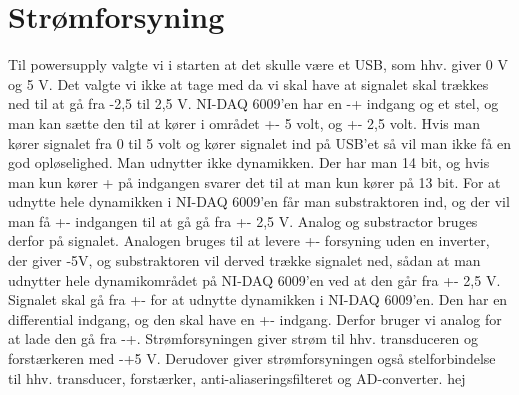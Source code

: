 \section{Strømforsyning}
Til powersupply valgte vi i starten at det skulle være et USB, som hhv. giver 0 V og 5 V. Det valgte vi ikke at tage med da vi skal have at signalet skal trækkes ned til at gå fra -2,5 til 2,5 V. NI-DAQ 6009'en har en -+ indgang og et stel, og man kan sætte den til at kører i området +- 5 volt, og +- 2,5 volt. Hvis man kører signalet fra 0 til 5 volt og kører signalet ind på USB’et så vil man ikke få en god opløselighed. Man udnytter ikke dynamikken. Der har man 14 bit, og hvis man kun kører + på indgangen svarer det til at man kun kører på 13 bit. For at udnytte hele dynamikken i NI-DAQ 6009’en får man substraktoren ind, og der vil man få +- indgangen til at gå gå fra +- 2,5 V. Analog og substractor bruges derfor på signalet. Analogen bruges til at levere +- forsyning uden en inverter, der giver -5V, og substraktoren vil derved trække signalet ned, sådan at  man udnytter hele dynamikområdet på NI-DAQ 6009’en ved at den  går fra +- 2,5 V. Signalet skal gå fra +- for at udnytte dynamikken i NI-DAQ 6009’en. Den har en differential indgang, og den skal have en +- indgang. Derfor bruger vi analog for at lade den gå fra -+.
Strømforsyningen giver strøm til hhv. transduceren og forstærkeren med -+5 V.  Derudover giver strømforsyningen også stelforbindelse til hhv. transducer, forstærker, anti-aliaseringsfilteret og AD-converter. hej